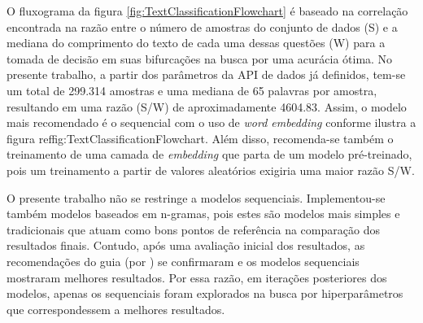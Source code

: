 O fluxograma da figura \ref{fig:TextClassificationFlowchart} é baseado na correlação encontrada na razão entre o número de amostras do conjunto de dados (S) e a mediana do comprimento do texto de cada uma dessas questões (W) para a tomada de decisão em suas bifurcações na busca por uma acurácia ótima. No presente trabalho, a partir dos parâmetros da API de dados já definidos, tem-se um total de 299.314 amostras e uma mediana de 65 palavras por amostra, resultando em uma razão (S/W) de aproximadamente 4604.83. Assim, o modelo mais recomendado é o sequencial com o uso de \textit{word embedding} conforme ilustra a figura ref{fig:TextClassificationFlowchart}. Além disso, recomenda-se também o treinamento de uma camada de \textit{embedding} que parta de um modelo pré-treinado, pois um treinamento a partir de valores aleatórios exigiria uma maior razão S/W.

O presente trabalho não se restringe a modelos sequenciais. Implementou-se também modelos baseados em n-gramas, pois estes são modelos mais simples e tradicionais que atuam como bons pontos de referência na comparação dos resultados finais. Contudo, após uma avaliação inicial dos resultados, as recomendações do guia (por \cite{Text_classification_guide}) se confirmaram e os modelos sequenciais mostraram melhores resultados. Por essa razão, em iterações posteriores dos modelos, apenas os sequenciais foram explorados na busca por hiperparâmetros que correspondessem a melhores resultados.